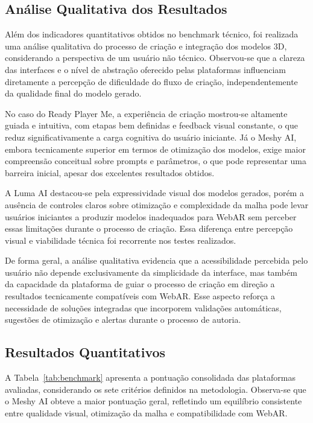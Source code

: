 \documentclass[conference]{IEEEtran}
\begin{document}
\subsection{Análise Qualitativa dos Resultados}

Além dos indicadores quantitativos obtidos no benchmark técnico, foi realizada uma análise qualitativa do processo de criação e integração dos modelos 3D, considerando a perspectiva de um usuário não técnico. Observou-se que a clareza das interfaces e o nível de abstração oferecido pelas plataformas influenciam diretamente a percepção de dificuldade do fluxo de criação, independentemente da qualidade final do modelo gerado.

No caso do Ready Player Me, a experiência de criação mostrou-se altamente guiada e intuitiva, com etapas bem definidas e feedback visual constante, o que reduz significativamente a carga cognitiva do usuário iniciante. Já o Meshy AI, embora tecnicamente superior em termos de otimização dos modelos, exige maior compreensão conceitual sobre prompts e parâmetros, o que pode representar uma barreira inicial, apesar dos excelentes resultados obtidos.

A Luma AI destacou-se pela expressividade visual dos modelos gerados, porém a ausência de controles claros sobre otimização e complexidade da malha pode levar usuários iniciantes a produzir modelos inadequados para WebAR sem perceber essas limitações durante o processo de criação. Essa diferença entre percepção visual e viabilidade técnica foi recorrente nos testes realizados.

De forma geral, a análise qualitativa evidencia que a acessibilidade percebida pelo usuário não depende exclusivamente da simplicidade da interface, mas também da capacidade da plataforma de guiar o processo de criação em direção a resultados tecnicamente compatíveis com WebAR. Esse aspecto reforça a necessidade de soluções integradas que incorporem validações automáticas, sugestões de otimização e alertas durante o processo de autoria.


\subsection{Resultados Quantitativos}

A Tabela~\ref{tab:benchmark} apresenta a pontuação consolidada das plataformas avaliadas, considerando os sete critérios definidos na metodologia. Observa-se que o Meshy AI obteve a maior pontuação geral, refletindo um equilíbrio consistente entre qualidade visual, otimização da malha e compatibilidade com WebAR.
\end{document}
